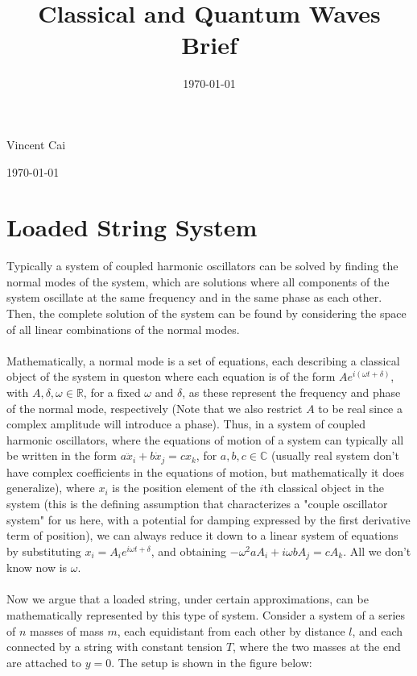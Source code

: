 \documentclass[12pt]{amsart}
\title{Classical and Quantum Waves Brief}
\date{\today}
\theoremstyle{definition}
\theoremstyle{remark}
\newcommand{\BR}{\mathbb R}
\newcommand{\BC}{\mathbb C}
\begin{document}
\maketitle

\vspace*{-0.25in}
\centerline{Vincent Cai}
\centerline{\today}
\vspace*{0.15in}

\section{Loaded String System}

Typically a system of coupled harmonic oscillators can be solved by finding the normal modes
of the system, which are solutions where all components of the system oscillate at the same 
frequency and in the same phase as each other. Then, the complete solution of the system can 
be found by considering the space of all linear combinations of the normal modes. \\ 
\\ 
Mathematically, a normal mode is a set of equations, each describing a classical object of the 
system in queston where each equation is of the form $Ae^{i(\omega t + \delta)}$, with $A, \delta, \omega \in \BR$, for a fixed 
$\omega$ and $\delta$, as these represent the frequency and phase of the normal mode, respectively (Note 
that we also restrict $A$ to be real since a complex amplitude will introduce a phase). Thus, in a 
system of coupled harmonic oscillators, where the equations of motion of a system can typically all 
be written in the form $a\ddot x_i + b \dot x_j = c x_k$, for $a,b,c \in \BC$ (usually real system don't have complex coefficients in the equations of motion, but mathematically it does generalize), where $x_i$ is the position element of the $i$th classical object in the system (this is the defining assumption that 
characterizes a "couple oscillator system" for us here, with a potential for damping expressed by the first 
derivative term of position), we can always reduce it down to a linear system of equations by substituting $x_i = A_ie^{i\omega t + \delta}$, and
obtaining $-\omega^2aA_i + i\omega bA_j = cA_k$. All we don't know now is $\omega$. \\ 
\\ 
Now we argue that a loaded string, under certain approximations, can be mathematically represented by this type of system. Consider a system of a series of $n$ masses of mass $m$, each 
equidistant from each other by distance $l$, and each connected by a string with constant tension $T$, where the two masses at the end are attached to $y=0$. The setup is shown in the figure below:\\
\end{document}
